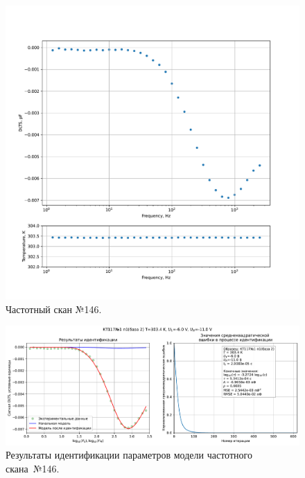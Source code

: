 \begin{figure}[!ht]
    \centering
    \includegraphics[width=1\textwidth]{../plots/КТ117№1_п1(база 2)_2500Гц-1Гц_1пФ_+30С_-6В-11В_100мВ_20мкс_шаг_0,1.pdf}
    \caption{Частотный скан №146.}
    \label{pic:frequency_scan_146}
\end{figure}

\begin{figure}[!ht]
    \centering
    \includegraphics[width=1\textwidth]{../plots/КТ117№1_п1(база 2)_2500Гц-1Гц_1пФ_+30С_-6В-11В_100мВ_20мкс_шаг_0,1_model.pdf}
    \caption{Результаты идентификации параметров модели частотного скана~№146.}
    \label{pic:frequency_scan_model146}
\end{figure}

\pagebreak


